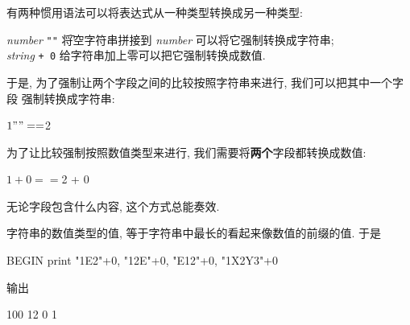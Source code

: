 有两种惯用语法可以将表达式从一种类型转换成另一种类型:
\begin{tabbing}
    \indent\textit{number} \verb'""'  \hspace{2em} \= 将空字符串拼接到
    \textit{number} 可以将它强制转换成字符串; \\
    \indent\textit{string} \verb'+ 0'  \> 给字符串加上零可以把它强制转换成数值.
\end{tabbing}
于是, 为了强制让两个字段之间的比较按照字符串来进行, 我们可以把其中一个字段
强制转换成字符串:
\begin{awkcode}
    $1 "" == $2
\end{awkcode}
为了让比较强制按照数值类型来进行, 我们需要将\textbf{两个}字段都转换成数值:
\begin{awkcode}
    $1 + 0 == $2 + 0
\end{awkcode}
无论字段包含什么内容, 这个方式总能奏效.

字符串的数值类型的值, 等于字符串中最长的看起来像数值的前缀的值. 于是
\begin{awkcode}
    BEGIN { print "1E2"+0, "12E"+0, "E12"+0, "1X2Y3"+0 }
\end{awkcode}
输出
\begin{awkcode}
    100 12 0 1
\end{awkcode}

